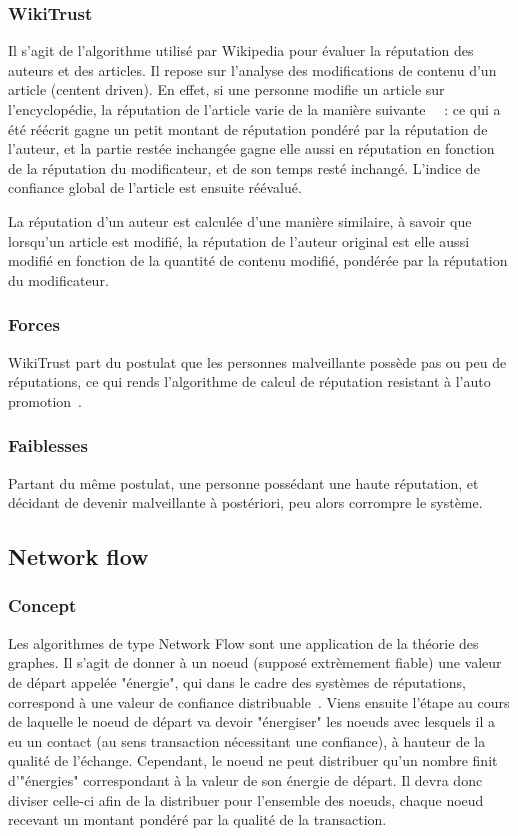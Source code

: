 \documentclass[a4paper, 11pt]{article} %
\begin{document}
\subsubsection{WikiTrust}
Il s'agit de l'algorithme utilisé par Wikipedia pour évaluer la réputation des auteurs et des articles. Il repose sur l'analyse des modifications de contenu d'un article (centent driven).
En effet, si une personne modifie un article sur l'encyclopédie, la réputation de l'article varie de la manière suivante~\cite{WikiTrust2010}~\cite{WikiTrustSite} :
ce qui a été réécrit gagne un petit montant de réputation pondéré par la réputation de l'auteur,
et la partie restée inchangée gagne elle aussi en réputation en fonction de la réputation du modificateur, et de son temps resté inchangé.
L'indice de confiance global de l'article est ensuite réévalué.

La réputation d'un auteur est calculée d'une manière similaire, à savoir que lorsqu'un article est modifié,
la réputation de l'auteur original est elle aussi modifié en fonction de la quantité de contenu modifié, pondérée par la réputation du modificateur.

\subsubsection{Forces}
WikiTrust part du postulat que les personnes malveillante possède pas ou peu de réputations, ce qui rends l'algorithme de calcul de réputation resistant à l'auto promotion~\cite{Tulungan2013}.

\subsubsection{Faiblesses}
Partant du même postulat, une personne possédant une haute réputation, et décidant de devenir malveillante à postériori, peu alors corrompre le système.

\subsection{Network flow}
\subsubsection{Concept}
Les algorithmes de type Network Flow sont une application de la théorie des graphes.
Il s'agit de donner à un noeud (supposé extrèmement fiable) une valeur de départ appelée "énergie", qui dans le cadre des systèmes de réputations, correspond à une valeur de confiance distribuable~\cite{ZieglerLausen2005}.
Viens ensuite l'étape au cours de laquelle le noeud de départ va devoir "énergiser" les noeuds avec lesquels il a eu un contact (au sens transaction nécessitant une confiance), à hauteur de la qualité de l'échange.
Cependant, le noeud ne peut distribuer qu'un nombre finit d'"énergies" correspondant à la valeur de son énergie de départ.
Il devra donc diviser celle-ci afin de la distribuer pour l'ensemble des noeuds, chaque noeud recevant un montant pondéré par la qualité de la transaction.
\end{document}

